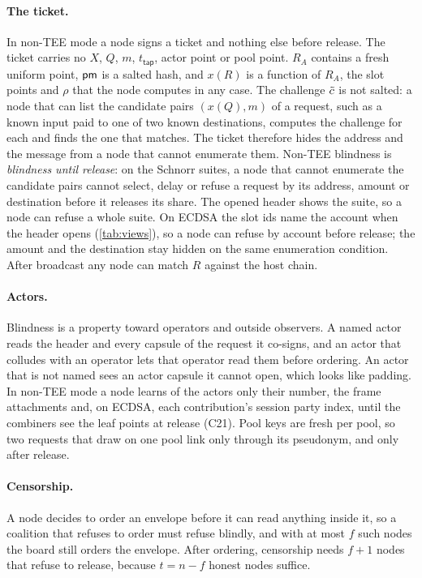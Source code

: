 \paragraph{The ticket.} In non-TEE mode a node signs a ticket and nothing else before release. The ticket carries no $X$, $Q$, $m$, $t_{\mathsf{tap}}$, actor point or pool point. $R_A$ contains a fresh uniform point, $\mathsf{pm}$ is a salted hash, and $x(R)$ is a function of $R_A$, the slot points and $\rho$ that the node computes in any case. The challenge $\tilde{c}$ is not salted: a node that can list the candidate pairs $(x(Q), m)$ of a request, such as a known input paid to one of two known destinations, computes the challenge for each and finds the one that matches. The ticket therefore hides the address and the message from a node that cannot enumerate them. Non-TEE blindness is \emph{blindness until release}: on the Schnorr suites, a node that cannot enumerate the candidate pairs cannot select, delay or refuse a request by its address, amount or destination before it releases its share. The opened header shows the suite, so a node can refuse a whole suite. On ECDSA the slot ids name the account when the header opens (\cref{tab:views}), so a node can refuse by account before release; the amount and the destination stay hidden on the same enumeration condition. After broadcast any node can match $R$ against the host chain.

\paragraph{Actors.} Blindness is a property toward operators and outside observers. A named actor reads the header and every capsule of the request it co-signs, and an actor that colludes with an operator lets that operator read them before ordering. An actor that is not named sees an actor capsule it cannot open, which looks like padding. In non-TEE mode a node learns of the actors only their number, the frame attachments and, on ECDSA, each contribution's session party index, until the combiners see the leaf points at release (C21). Pool keys are fresh per pool, so two requests that draw on one pool link only through its pseudonym, and only after release.

\paragraph{Censorship.} A node decides to order an envelope before it can read anything inside it, so a coalition that refuses to order must refuse blindly, and with at most $f$ such nodes the board still orders the envelope. After ordering, censorship needs $f + 1$ nodes that refuse to release, because $t = n - f$ honest nodes suffice.

